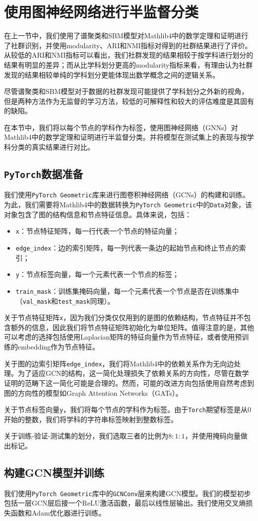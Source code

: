 \section{使用图神经网络进行半监督分类}
在上一节中，我们使用了谱聚类和SBM模型对Mathlib4中的数学定理和证明进行了社群识别，并使用modularity、ARI和NMI指标对得到的社群结果进行了评价。从较低的ARI和NMI指标可以看出，我们社群发现的结果相较于按学科进行划分的结果有明显的差异；而从比学科划分更高的modularity指标来看，有理由认为社群发现的结果相较单纯的学科划分更能体现出数学概念之间的逻辑关系。

尽管谱聚类和SBM模型对于数据的社群发现可能提供了学科划分之外新的视角，但是两种方法作为无监督的学习方法，较低的可解释性和较大的评估难度是其固有的缺陷。

在本节中，我们将以每个节点的学科作为标签，使用图神经网络（GNNs）对Mathlib4中的数学定理和证明进行半监督分类。并将模型在测试集上的表现与按学科分类的真实结果进行对比。

\subsection{\texttt{PyTorch}数据准备}
我们使用\texttt{PyTorch Geometric}库来进行图卷积神经网络（GCNs）的构建和训练。为此，我们需要将Mathlib4中的数据转换为\texttt{PyTorch Geometric}中的\texttt{Data}对象，该对象包含了图的结构信息和节点特征信息。具体来说，包括：
\begin{itemize}
    \item \texttt{x}：节点特征矩阵，每一行代表一个节点的特征向量；
    \item \texttt{edge\_index}：边的索引矩阵，每一列代表一条边的起始节点和终止节点的索引；
    \item \texttt{y}：节点标签向量，每一个元素代表一个节点的标签；
    \item \texttt{train\_mask}：训练集掩码向量，每一个元素代表一个节点是否在训练集中（\texttt{val\_mask}和\texttt{test\_mask}同理）。
\end{itemize}

关于节点特征矩阵\texttt{x}，因为我们分类仅仅用到的是图的依赖结构，节点特征并不包含额外的信息，因此我们将节点特征矩阵初始化为单位矩阵。值得注意的是，其他可以考虑的选择包括使用Laplacian矩阵的特征向量作为节点特征，或者使用预训练的embedding作为节点特征。

关于图的边索引矩阵\texttt{edge\_index}，我们将Mathlib4中的依赖关系作为无向边处理。为了适应GCN的结构，这一简化处理损失了依赖关系的方向性，尽管在数学证明的范畴下这一简化可能是合理的。然而，可能的改进方向包括使用自然考虑到图的方向性的模型如Graph Attention Networks（GATs）。

关于节点标签向量\texttt{y}，我们将每个节点的学科作为标签。由于\texttt{Torch}期望标签是从0开始的整数，我们将学科的字符串标签映射到整数标签。

关于训练-验证-测试集的划分，我们选取三者的比例为$8:1:1$，并使用掩码向量做出标记。

\subsection{构建GCN模型并训练}
我们使用\texttt{PyTorch Geometric}库中的\texttt{GCNConv}层来构建GCN模型。我们的模型初步包括一层GCN层后接一个ReLU激活函数，最后以线性层输出。我们使用交叉熵损失函数和Adam优化器进行训练。
